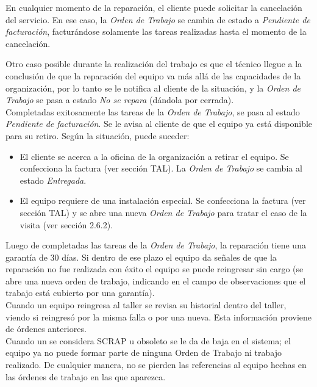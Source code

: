 \documentclass[12pt]{extarticle}
\begin{document}
\begin{spacing}{1.2}
    En cualquier momento de la reparación, el cliente puede solicitar la cancelación del servicio. En ese caso, la \textit{Orden de Trabajo} se cambia de estado a \textit{Pendiente de facturación}, facturándose solamente las tareas realizadas hasta el momento de la cancelación.
    
    Otro caso posible durante la realización del trabajo es que el técnico llegue a la conclusión de que la reparación del equipo va más allá de las capacidades de la organización, por lo tanto se le notifica al cliente de la situación, y la \textit{Orden de Trabajo} se pasa a estado \textit{No se repara} (dándola por cerrada).\\

    Completadas exitosamente las tareas de la \textit{Orden de Trabajo}, se pasa al estado \textit{Pendiente de facturación}. Se le avisa al cliente de que el equipo ya está disponible para su retiro. Según la situación, puede suceder:
    \begin{itemize}
        \item El cliente se acerca a la oficina de la organización a retirar el equipo. Se confecciona la factura (ver sección TAL). La \textit{Orden de Trabajo} se cambia al estado \textit{Entregada}.
        \item El equipo requiere de una instalación especial. Se confecciona la factura (ver sección TAL) y se abre una nueva \textit{Orden de Trabajo} para tratar el caso de la visita (ver sección 2.6.2).
    \end{itemize}

    Luego de completadas las tareas de la \textit{Orden de Trabajo}, la reparación tiene una garantía de 30 días. Si dentro de ese plazo el equipo da señales de que la reparación no fue realizada con éxito el equipo se puede reingresar sin cargo (se abre una nueva orden de trabajo, indicando en el campo de observaciones que el trabajo está cubierto por una garantía). \\
    

    Cuando un equipo reingresa al taller se revisa su historial dentro del taller, viendo si reingresó por la misma falla o por una nueva. Esta información proviene de órdenes anteriores. \\


    Cuando un se considera SCRAP u obsoleto se le da de baja en el sistema; el equipo ya no puede formar parte de ninguna Orden de Trabajo ni trabajo realizado. De cualquier manera, no se pierden las referencias al equipo hechas en las órdenes de trabajo en las que aparezca.


\end{spacing}
\end{document}
